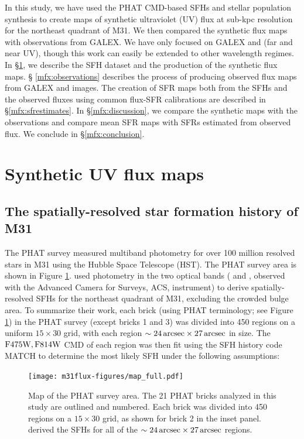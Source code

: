 In this study, we have used the PHAT CMD-based SFHs and stellar population
synthesis to create maps of synthetic ultraviolet (UV) flux at sub-kpc
resolution for the northeast quadrant of M31. We then compared the synthetic
flux maps with observations from GALEX. We have only focused on GALEX \fuv{}
and \nuv{} (far and near UV), though this work can easily be extended to other
wavelength regimes. In \S \ref{mfx:syntheticfluxmaps}, we describe the SFH
dataset and the production of the synthetic flux maps. \S
\ref{mfx:observations} describes the process of producing observed flux maps
from GALEX \fuv{} and \nuv{} images. The creation of SFR maps both from the
SFHs and the observed fluxes using common flux-SFR calibrations are described
in \S \ref{mfx:sfrestimates}. In \S \ref{mfx:discussion}, we compare the
synthetic maps with the observations and compare mean SFR maps with SFRs
estimated from observed flux. We conclude in \S \ref{mfx:conclusion}.





\section{Synthetic UV flux maps}\label{mfx:syntheticfluxmaps}



\subsection{The spatially-resolved star formation history of M31}

The PHAT survey \citep{Dalcanton:2012} measured multiband photometry for over
100 million resolved stars in M31 using the Hubble Space Telescope (HST). The
PHAT survey area is shown in Figure \ref{fig:mfx:dummy1}. \citet{Lewis:2014}
used photometry in the two optical bands (\acsb{} and \acsi{}, observed with
the Advanced Camera for Surveys, ACS, instrument) to derive spatially-resolved
SFHs for the northeast quadrant of M31, excluding the crowded bulge area. To
summarize their work, each brick (using PHAT terminology; see Figure
\ref{fig:mfx:dummy1}) in the PHAT survey (except bricks 1 and 3) was divided
into 450 regions on a uniform $15 \times 30$ grid, with each region $\sim
24\,\mathrm{arcsec} \times 27\,\mathrm{arcsec}$ in size. The $\mathrm{F475W},\mathrm{F814W}$ CMD of each region was
then fit using the SFH history code MATCH \citep{Dolphin:2002} to determine the
most likely SFH under the following assumptions:


\begin{figure}
\centering
\texttt{[image: m31flux-figures/map\_full.pdf]}
\caption[PHAT survey map.]{Map of the PHAT survey area. The 21 PHAT bricks
    analyzed in this study are outlined and numbered. Each brick was divided
    into 450 regions on a $15 \times 30$ grid, as shown for brick 2 in the
    inset panel. \citet{Lewis:2014} derived the SFHs for all of the $\sim
    24\,\mathrm{arcsec} \times 27\,\mathrm{arcsec}$ regions.
}
\label{fig:mfx:dummy1}
\end{figure}


